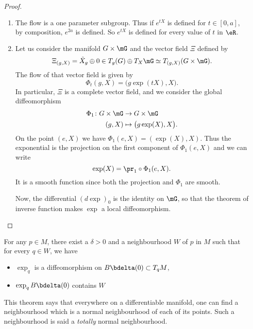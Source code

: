 \begin{proof}
	\begin{enumerate}

		\item
			The flow is a one parameter subgroup. Thus if $ e^{tX}$ is defined for $t\in[0,a]$, by composition, $ e^{2a}$ is defined. So $ e^{tX}$ is defined for every value of $t$ in $\eR$.
		\item
			Let us consider the manifold $G\times \mG$ and the vector field $\Xi$ defined by
			\begin{equation}
				\Xi_{(g,X)}=\tilde X_g\oplus 0\in T_g(G)\oplus T_X\mG\simeq T_{(g,X)}(G\times \mG).
			\end{equation}
			The flow of that vector field is given by
			\begin{equation}
				\Phi_t(g,X)=\big( g\exp(tX),X \big).
			\end{equation}
			In particular, $\Xi$ is a complete vector field, and we consider the global diffeomorphism
			\begin{equation}
				\begin{aligned}
					\Phi_1\colon G\times \mG&\to G\times \mG \\
					(g,X)&\mapsto \big( g\exp(X),X \big).
				\end{aligned}
			\end{equation}
			On the point $(e,X)$ we have $\Phi_1(e,X)=(\exp(X),X)$. Thus the exponential is the projection on the first component of $\Phi_1(e,X)$ and we can write
			\begin{equation}
				\exp(X)=\pr_1\circ\Phi_1(e,X).
			\end{equation}
			It is a smooth function since both the projection and $\Phi_1$ are smooth.

			Now, the differential $(d\exp)_0$ is the identity on $\mG$, so that the theorem of inverse function makes $\exp$ a local diffeomorphism.
	\end{enumerate}
\end{proof}


\begin{theorem}
For any $p\in M$, there exist a $\delta>0$ and a neighbourhood $W$ of $p$ in $M$ such that for every $q\in W$, we have

\begin{itemize}
\item $\exp_q$ is a diffeomorphism on $B\bdelta(0)\subset T_qM$,
\item $\exp_q B\bdelta(0)$ contains $W$
\end{itemize}
\end{theorem}
This theorem says that everywhere on a differentiable manifold, one can find a neighbourhood which is a normal neighbourhood of each of its points. Such a neighbourhood is said a \emph{totally} normal neighbourhood.

